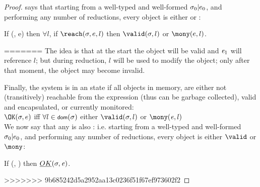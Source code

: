 \begin{Assumption}
\begin{Assumption}
\begin{Assumption}
\begin{proof}
 says that starting from a well-typed and well-formed $\sigma_0|e_0$, and performing any number of reductions, every \reach object is either \valid or \mony:%
\SS\begin{theorem}\rm
If \VS(\s, e) then $\forall l$, if $\reach(\s, e, l)$ then $\valid(\s, l)$ or $\mony(e, l)$.
\end{theorem}
=======
The idea is that at the start the object will be valid and ${\mathit{e}}_1$ will reference $l$;
but during reduction, $l$ will be used to
modify the object; only after that moment, the object may become invalid.


Finally, the system is in an \OK state
if all objects in memory, are either
not (transitively) reachable from the expression (thus can be garbage collected),
valid and encapsulated,
or currently monitored:\\
\indent $\OK(\sigma,e)$ iff $\forall l\in\dom(\sigma)$
  either $\valid(\sigma,l)$ or $\mony(\e,l)$\\

\noindent We now say that any \VS is also \OK: i.e. starting from a well-typed and well-formed $\sigma_0|e_0$, and performing any number of reductions, every object is either $\valid$ or $\mony$:
\begin{theorem}\rm
If \VS(\s, \e) then $\emph{OK}(\sigma,{\mathit{e}})$.
\end{theorem}

>>>>>>> 9b685242d5a2952aa13c0236f51f67ef973602f2


\end{proof}
\end{Assumption}
\end{Assumption}
\end{Assumption}
